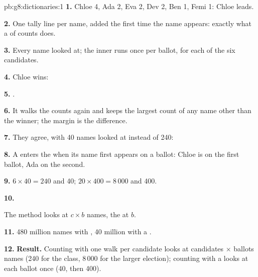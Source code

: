 \begin{solution}{pb:g8:dictionaries:1}
\textbf{1.} Chloe 4, Ada 2, Eva 2, Dev 2, Ben 1, Femi 1: Chloe leads.

\textbf{2.} One tally line per name, added the first time the name appears:
exactly what a  of counts does.

\textbf{3.} Every name looked at; the inner  runs once per ballot, for
each of the six candidates.

\textbf{4.} Chloe wins:

\label{out:g8:dictionaries:votes-list}

\textbf{5.} .

\textbf{6.} It walks the counts again and keeps the largest count of any
name other than the winner; the margin is the difference.

\textbf{7.} They agree, with 40 names looked at instead of 240:

\label{out:g8:dictionaries:votes-dict}

\textbf{8.} A  enters the  when its name first appears on a
ballot: Chloe is on the first ballot, Ada on the second.

\textbf{9.} $6 \times 40 = 240$ and 40; $20 \times 400 = 8\,000$ and 400.

\textbf{10.}

\label{out:g8:dictionaries:compare}

The  method looks at $c \times b$ names, the  at $b$.

\textbf{11.} 480 million names with , 40 million with a .

\textbf{12.} \textbf{Result.} Counting with one walk per candidate looks at
candidates $\times$ ballots names (240 for the class, 8\,000 for the larger
election); counting with a  looks at each ballot once (40, then
400).
\end{solution}
